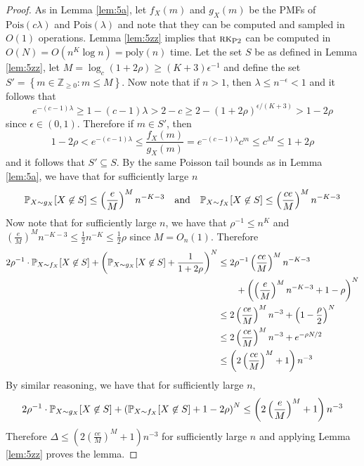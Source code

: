 \begin{proof}
As in Lemma \ref{lem:5a}, let $f_X(m)$ and $g_X(m)$ be the PMFs of $\text{Pois}(c \lambda)$ and $\text{Pois}(\lambda)$ and note that they can be computed and sampled in $O(1)$ operations. Lemma \ref{lem:5zz} implies that $\textsc{rk}_{\text{P2}}$ can be computed in $O(N) = O(n^K \log n) = \text{poly}(n)$ time. Let the set $S$ be as defined in Lemma \ref{lem:5zz}, let $M =  \log_c (1 + 2 \rho) \ge (K + 3)\epsilon^{-1}$ and define the set $S' = \left\{ m \in \mathbb{Z}_{\ge 0} : m \le M \right\}$. Now note that if $n > 1$, then $\lambda \le n^{-\epsilon} < 1$ and it follows that
$$e^{-(c - 1)\lambda} \ge 1 - (c - 1)\lambda > 2 - c \ge 2 - (1 + 2\rho)^{\epsilon/(K + 3)} > 1 - 2\rho$$
since $\epsilon \in (0, 1)$. Therefore if $m \in S'$, then
$$1 - 2\rho < e^{-(c - 1)\lambda} \le \frac{f_X(m)}{g_X(m)} = e^{-(c - 1)\lambda} c^m \le c^M \le 1 + 2\rho$$
and it follows that $S' \subseteq S$. By the same Poisson tail bounds as in Lemma \ref{lem:5a}, we have that for sufficiently large $n$
$$\mathbb{P}_{X \sim g_X}[X \not \in S] \le \left(\frac{e}{M} \right)^M n^{-K-3} \quad \text{and} \quad \mathbb{P}_{X \sim f_X}[X \not \in S] \le \left(\frac{ce}{M} \right)^M n^{-K-3}$$
Now note that for sufficiently large $n$, we have that $\rho^{-1} \le n^K$ and $\left(\frac{e}{M} \right)^M n^{-K - 3} \le \frac{1}{2} n^{-K} \le \frac{1}{2}\rho$ since $M = O_n(1)$. Therefore
\begin{align*}
2\rho^{-1} \cdot \mathbb{P}_{X \sim f_X} [X \not \in S] + \left( \mathbb{P}_{X \sim g_X}[X \not \in S] + \frac{1}{1 + 2\rho} \right)^{N} &\le 2\rho^{-1} \left(\frac{ce}{M} \right)^M n^{-K-3} \\
&\quad \quad + \left( \left(\frac{e}{M} \right)^M n^{-K - 3} + 1 - \rho \right)^N \\
&\le 2 \left(\frac{ce}{M} \right)^M n^{-3} + \left( 1 - \frac{\rho}{2} \right)^N \\
&\le 2 \left(\frac{ce}{M} \right)^M n^{-3} + e^{-\rho N/2} \\
&\le \left( 2 \left(\frac{ce}{M} \right)^M + 1 \right) n^{-3}
\end{align*}
By similar reasoning, we have that for sufficiently large $n$,
$$2\rho^{-1} \cdot \mathbb{P}_{X \sim g_X} [X \not \in S] + \left( \mathbb{P}_{X \sim f_X}[X \not \in S] + 1 - 2\rho \right)^{N} \le \left( 2\left(\frac{e}{M} \right)^M + 1 \right) n^{-3}$$
Therefore $\Delta \le \left( 2 \left(\frac{ce}{M} \right)^M + 1 \right) n^{-3}$ for sufficiently large $n$ and applying Lemma \ref{lem:5zz} proves the lemma.
\end{proof}

